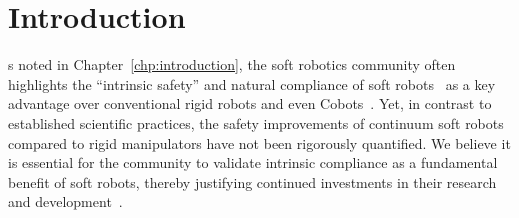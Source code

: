 \section{Introduction}
s noted in Chapter~\ref{chp:introduction}, the soft robotics community often highlights the “intrinsic safety” and natural compliance of soft robots~\citep{abidi2017intrinsic} as a key advantage over conventional rigid robots and even \glspl{Cobot}~\citep{laschi2014soft, rus2015design, yasa2023overview}. Yet, in contrast to established scientific practices, the safety improvements of continuum soft robots compared to rigid manipulators have not been rigorously quantified. We believe it is essential for the community to validate intrinsic compliance as a fundamental benefit of soft robots, thereby justifying continued investments in their research and development~\citep{hawkes2021hard}.

